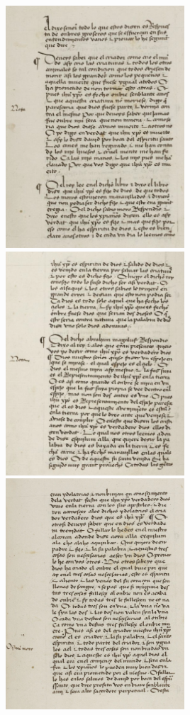 \includegraphics[width=0.5\textwidth]{HistoireIslamMediterranee/Images/DisputaFez3.png}
\includegraphics[width=0.5\textwidth]{HistoireIslamMediterranee/Images/DisputaFez4.png}
\includegraphics[width=0.5\textwidth]{HistoireIslamMediterranee/Images/DisputaFez5.png}
